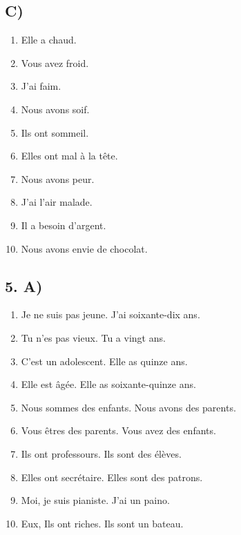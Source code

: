 \subsection*{C)}

\begin{enumerate}
    \item Elle a chaud.
    \item Vous avez froid.
    \item J'ai faim.
    \item Nous avons soif.
    \item Ils ont sommeil.
    \item Elles ont mal à la tête.
    \item Nous avons peur.
    \item J'ai l'air malade.
    \item Il a besoin d'argent.
    \item Nous avons envie de chocolat.
\end{enumerate}

\subsection*{5. A)}

\begin{enumerate}
    \item Je ne suis pas jeune. J'ai soixante-dix ans.
    \item Tu n'es pas vieux. Tu a vingt ans.
    \item C'est un adolescent. Elle as quinze ans.
    \item Elle est âgée. Elle as soixante-quinze ans.
    \item Nous sommes des enfants. Nous avons des parents.
    \item Vous êtres des parents. Vous avez des enfants.
    \item Ils ont professours. Ils sont des élèves.
    \item Elles ont secrétaire. Elles sont des patrons.
    \item Moi, je suis pianiste. J'ai un paino.
    \item Eux, Ils ont riches. Ils sont un bateau.  
\end{enumerate}